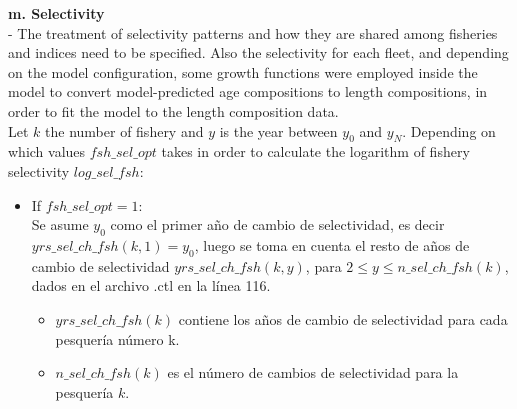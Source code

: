 \documentclass{article}
\begin{document}
\textbf{m. Selectivity}\\
- The treatment of selectivity patterns and how they are shared among fisheries and indices need to be specified. Also the selectivity for each fleet, and depending on the model configuration, some growth functions were employed inside the model to convert model-predicted age compositions to length compositions, in order to fit the model to the length composition data.\\

Let $k$ the number of fishery and $y$ is the year between $y_0$ and $y_N$.
Depending on which values $fsh\_sel\_opt$ takes in order to calculate the logarithm of fishery selectivity $log\_sel\_fsh$:
\begin{itemize}
\item If $fsh\_sel\_opt=1:$\\
Se asume $y_0$ como el primer año de cambio de selectividad, es decir $yrs\_sel\_ch\_fsh(k,1)=y_0$, luego se toma en cuenta el resto de años de cambio de selectividad $yrs\_sel\_ch\_fsh(k,y)$, para $2\leq y \leq n\_sel\_ch\_fsh(k)$, dados en el archivo .ctl en la línea 116.
\begin{itemize}
    \item $yrs\_sel\_ch\_fsh(k)$ contiene los años de cambio de selectividad para cada pesquería número k.
    \item $n\_sel\_ch\_fsh(k)$ es el número de cambios de selectividad para la pesquería $k$.
    
\end{itemize}



\end{itemize}
\end{document}

